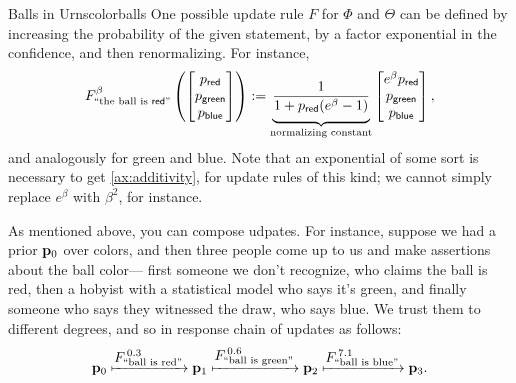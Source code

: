 \documentclass{article}
\begin{document}
\begin{examplex}{Balls in Urns}{colorballs}
One possible update rule $F$ for $\Phi$ and $\Theta$ can be defined by increasing the probability of the given statement, by a factor exponential in the confidence, and then renormalizing.
For instance,
    \[
        F^{\beta}_{\text{``the ball is ${\mathsf{red}}$''}} \left(
            \begin{bmatrix} p_{\mathsf{red}} \\ p_{\mathsf{green}} \\ p_{\mathsf{blue}} \\ \end{bmatrix}
        \right) :=
            \underbrace{\vphantom{\Bigg|}
                \frac{1}{1 + p_{\mathsf{red}} (e^{\beta} - 1) }
            }_{\text{normalizing constant}}
            \begin{bmatrix}
                e^\beta  p_{\mathsf{red}} \\
                p_{\mathsf{green}}  \\
                p_{\mathsf{blue}}
            \end{bmatrix},
    \]
    and analogously for green and blue.
    Note that an exponential of some sort is necessary to get \cref{ax:additivity}, for update rules of this kind; we cannot simply replace
    $e^{\beta}$ with $\beta^2$, for instance.

    As mentioned above, you can compose udpates. For instance, suppose we had a prior $\mathbf{p}_0$ over colors, and then three people come up to us and make assertions about the ball color---%
    first someone we don't recognize, who claims the ball is red, then a hobyist with a statistical model who says it's green, and finally someone who says they witnessed the draw, who says blue.
    We trust them to different degrees, and so in response  chain of updates as follows:
    \[
        \mathbf{p}_0
            \xmapsto{\displaystyle F^{\,0.3}_{\text{``ball is red''}}}
        \mathbf{p}_1
            \xmapsto{\displaystyle F^{\,0.6}_{\text{``ball is green''}}}
        \mathbf{p}_2
            \xmapsto{\displaystyle F^{\,7.1}_{\text{``ball is blue''}}}
        \mathbf{p}_3.
    \]


\end{examplex}
\end{document}
